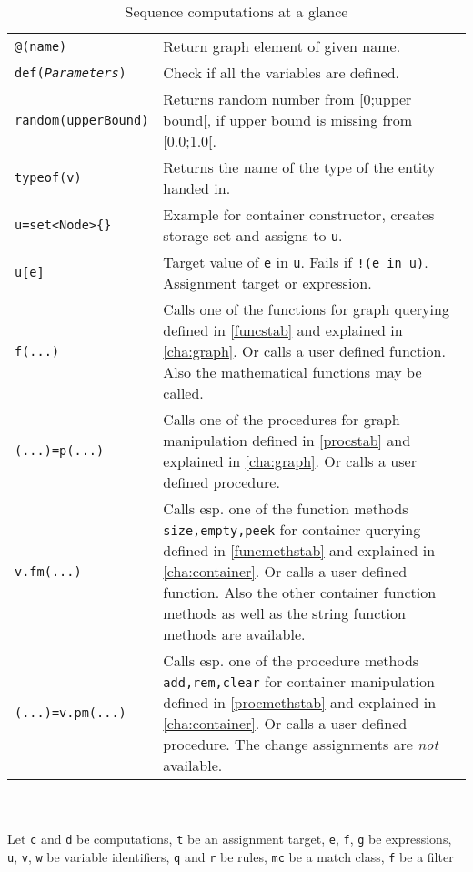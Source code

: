 \begin{table}[htbp]
\begin{minipage}{\linewidth}
\begin{tabularx}{\linewidth}{|lX|}
\texttt{@(name)} & Return graph element of given name.\\
\texttt{def(\emph{Parameters})} & Check if all the variables are defined.\\
\texttt{random(upperBound)} & Returns random number from [0;upper bound[, if upper bound is missing from [0.0;1.0[.\\
\texttt{typeof(v)} & Returns the name of the type of the entity handed in.\\
\hline
\texttt{u=set<Node>\{\}} & Example for container constructor, creates storage set and assigns to \texttt{u}.\\
\texttt{u[e]} & Target value of \texttt{e} in \texttt{u}. Fails if \texttt{!(e in u)}. Assignment target or expression.\\
\hline
\texttt{f(...)} & Calls one of the functions for graph querying defined in \ref{funcstab} and explained in \ref{cha:graph}. Or calls a user defined function. Also the mathematical functions may be called.\\
\hline
\texttt{(...)=p(...)} & Calls one of the procedures for graph manipulation defined in \ref{procstab} and explained in \ref{cha:graph}. Or calls a user defined procedure.\\
\hline
\texttt{v.fm(...)} & Calls esp. one of the function methods \texttt{size,empty,peek} for container querying defined in \ref{funcmethstab} and explained in \ref{cha:container}. Or calls a user defined function. Also the other container function methods as well as the string function methods are available.\\
\hline
\texttt{(...)=v.pm(...)} & Calls esp. one of the procedure methods \texttt{add,rem,clear} for container manipulation defined in \ref{procmethstab} and explained in \ref{cha:container}. Or calls a user defined procedure. The change assignments are \emph{not} available.\\
\hline
\end{tabularx}
\end{minipage}\\
\\ 
{\small Let \texttt{c} and \texttt{d} be computations, \texttt{t} be an assignment target, \texttt{e}, \texttt{f}, \texttt{g} be expressions, \texttt{u}, \texttt{v}, \texttt{w} be variable identifiers, \texttt{q} and \texttt{r} be rules, \texttt{mc} be a match class, \texttt{f} be a filter }
\caption{Sequence computations at a glance}
\label{comptab}
\end{table}
 


